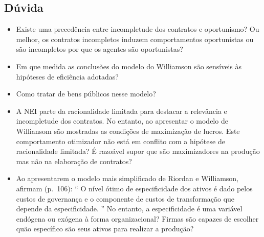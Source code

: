 \begin{sigstatement}
\sffamily
{}
{%
\begin{mdframed}[style=stylesigstyle]%
	
\section*{Dúvida}%

\begin{itemize}
	\item Existe uma precedência entre incompletude dos contratos e oportunismo? Ou melhor, os contratos incompletos induzem comportamentos oportunistas ou são incompletos por que os agentes são oportunistas?
	\item Em que medida as conclusões do modelo do Williamson são sensíveis às hipóteses de eficiência adotadas?
	\item Como tratar de bens públicos nesse modelo?
	\item A NEI parte da racionalidade limitada para destacar a relevância e incompletude dos contratos. No entanto, ao apresentar o modelo de Williansom são mostradas as condições de maximização de lucros. Este comportamento otimizador não está em conflito com a hipótese de racionalidade limitada? É razoável supor que são maximizadores na produção mas não na elaboração de contratos?
	\item Ao apresentarem o modelo mais simplificado de Riordan e Williamson, afirmam (p.~106): `` O nível ótimo de especificidade dos ativos é dado pelos custos de governança e o componente de custos de transformação que depende da especificidade. '' No entanto, a especificidade é uma variável endógena ou exógena à forma organizacional? Firmas são capazes de escolher quão específico são seus ativos para realizar a produção?
\end{itemize}

\end{mdframed}}
\end{sigstatement}